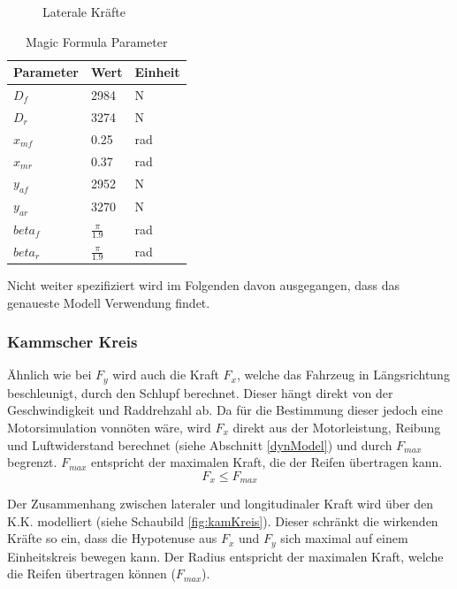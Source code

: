 \documentclass{like}
\begin{document}
\begin{figure}[ht!]
	\centering
	 
	\caption{Laterale Kräfte}
	\label{fig:pacejka}
\end{figure}



\begin{table}[]
	\centering
	\caption{Magic Formula Parameter}
	\begin{tabular}{l|l|l}
		\hline
		Parameter	&  Wert  & Einheit \\ \hline
		\(D_f\)		&  2984 & N \\
		\(D_r\)		&  3274 & N \\
		\(x_{mf}\)	&  0.25 & rad \\
		\(x_{mr}\)	&  0.37 & rad \\
		\(y_{af}\)	&  2952 & N \\
 		\(y_{ar}\)	&  3270 & N \\
		\(beta_{f}\)	&  $\frac{\pi}{1.9}$ & rad \\
		\(beta_{r}\)	&  $\frac{\pi}{1.9}$ & rad \\
		
	\end{tabular}
	
	\label{tireParam}
\end{table}

Nicht weiter spezifiziert wird im Folgenden davon ausgegangen, dass das genaueste Modell Verwendung findet.



\subsubsection*{Kammscher Kreis}

Ähnlich wie bei \(F_y\) wird auch die Kraft \(F_x\), welche das Fahrzeug in Längsrichtung beschleunigt, durch den Schlupf berechnet. Dieser hängt direkt von der Geschwindigkeit und Raddrehzahl ab. Da für die Bestimmung dieser jedoch eine Motorsimulation vonnöten wäre, wird \(F_x\) direkt aus der Motorleistung, Reibung und Luftwiderstand berechnet (siehe Abschnitt \ref{dynModel}) und durch \(F_{max}\) begrenzt. \(F_{max}\) entspricht der maximalen Kraft, die der Reifen übertragen kann.\\
\begin{equation}
F_x \leq F_{max}
\end{equation}

Der Zusammenhang zwischen lateraler und longitudinaler Kraft wird über den \ac{K.K.} modelliert (siehe Schaubild \ref{fig:kamKreis}). Dieser schränkt die wirkenden Kräfte so ein, dass die Hypotenuse aus \(F_x\) und \(F_y\) sich maximal auf einem Einheitskreis bewegen kann. Der Radius entspricht der maximalen Kraft, welche die Reifen übertragen können (\(F_{max}\)).
\end{document}
